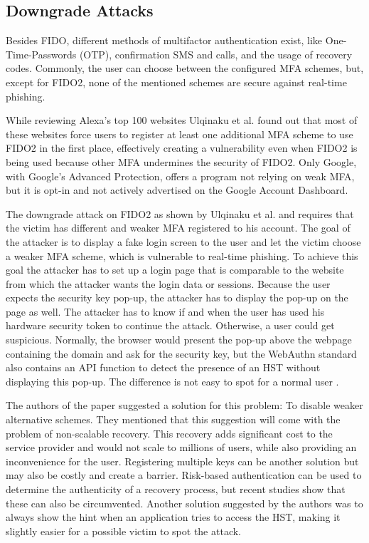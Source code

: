 \documentclass[runningheads]{llncs}
\begin{document}
\subsection{Downgrade Attacks}
Besides FIDO, different methods of multifactor authentication exist, like One-Time-Passwords (OTP), confirmation SMS and calls, and the usage of recovery codes. Commonly, the user can choose between the configured MFA schemes, but, except for FIDO2, none of the mentioned schemes are secure against real-time phishing. 

While reviewing Alexa's top 100 websites Ulqinaku et al. found out that most of these websites force users to register at least one additional MFA scheme to use FIDO2 in the first place, effectively creating a vulnerability even when FIDO2 is being used because other MFA undermines the security of FIDO2. Only Google, with Google's Advanced Protection, offers a program not relying on weak MFA, but it is opt-in and not actively advertised on the Google Account Dashboard.

The downgrade attack on FIDO2 as shown by Ulqinaku et al. and requires that the victim has different and weaker MFA registered to his account. The goal of the attacker is to display a fake login screen to the user and let the victim choose a weaker MFA scheme, which is vulnerable to real-time phishing. To achieve this goal the attacker has to set up a login page that is comparable to the website from which the attacker wants the login data or sessions. Because the user expects the security key pop-up, the attacker has to display the pop-up on the page as well. The attacker has to know if and when the user has used his hardware security token to continue the attack. Otherwise, a user could get suspicious. Normally, the browser would present the pop-up above the webpage containing the domain and ask for the security key, but the WebAuthn standard also contains an API function to detect the presence of an HST without displaying this pop-up. The difference is not easy to spot for a normal user \cite{274610}.

The authors of the paper suggested a solution for this problem: To disable weaker alternative schemes. They mentioned that this suggestion will come with the problem of non-scalable recovery. This recovery adds significant cost to the service provider and would not scale to millions of users, while also providing an inconvenience for the user. Registering multiple keys can be another solution but may also be costly and create a barrier. Risk-based authentication can be used to determine the authenticity of a recovery process, but recent studies show that these can also be circumvented. Another solution suggested by the authors was to always show the hint when an application tries to access the HST, making it slightly easier for a possible victim to spot the attack.
\end{document}
